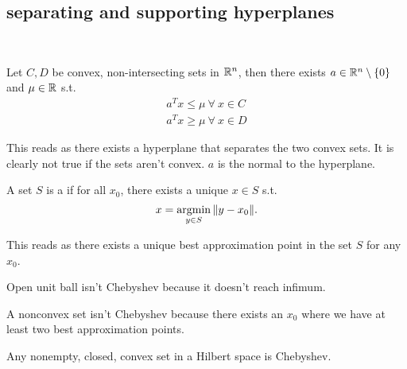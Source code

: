 \documentclass[class=article,crop=false]{standalone}
\begin{document}
\subsection{separating and supporting hyperplanes}
~\begin{thm}
Let $ C,D$ be convex, non-intersecting sets in  $ \mathbb{R}^{n}$, then there exists $ a \in \mathbb{R}^{n} \setminus \{0\} $ and $ \mu \in \mathbb{R}$ s.t. 
\begin{align*}
	a^{T}x \leq \mu \ \forall \ x \in C\\
	a^{T} x \geq \mu \ \forall \ x \in D
\end{align*}
\end{thm}
\begin{note}
This reads as there exists a hyperplane that separates the two convex sets. It is clearly not true if the sets aren't convex. $ a$ is the normal to the hyperplane.
\end{note}

\begin{defn}
A set $ S$ is a   if for all $ x_0$, there exists a unique $ x \in S$ s.t. 
\[
x = \operatorname*{argmin}_{y \in S} {\left\lVert{ y-x_0}\right\rVert} 
.\] 
\end{defn}
\begin{note}
This reads as there exists a unique best approximation point in the set $ S$ for any $ x_0$.
\end{note}
\begin{eg}
Open unit ball isn't Chebyshev because it doesn't reach infimum.
\end{eg}
\begin{eg}
A nonconvex set isn't Chebyshev because there exists an $ x_0$ where we have at least two best approximation points.
\end{eg}
\begin{thm}
Any nonempty, closed, convex set in a Hilbert space is Chebyshev.
\end{thm}
\end{document}
